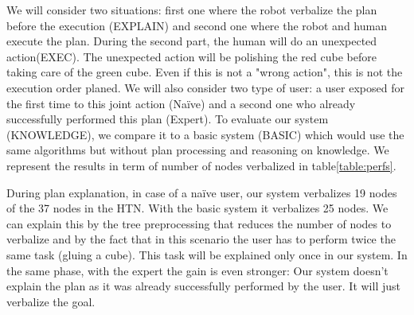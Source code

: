 \documentclass{llncs}
\begin{document}
We will consider two situations: first one where the robot verbalize the plan before the execution (EXPLAIN) and second one where the robot and human execute the plan. During the second part, the human will do an unexpected action(EXEC). The unexpected action will be polishing the red cube before taking care of the green cube. Even if this is not a "wrong action", this is not the execution order planed. We will also consider two type of user: a user exposed for the first time to this joint action (Na\"ive) and a second one who already successfully performed this plan (Expert).
%
%
%
%
To evaluate our system (KNOWLEDGE), we compare it to a basic system (BASIC) which would use the same algorithms but without plan processing and reasoning on knowledge. We represent the results in term of number of nodes verbalized in table\ref{table:perfs}.

During plan explanation, in case of a na\"ive user, our system verbalizes 19 nodes of the 37 nodes in the HTN. With the basic system it verbalizes 25 nodes.
We can explain this by the tree preprocessing that reduces the number of nodes to verbalize and by the fact that in this scenario the user has to perform twice the same task (gluing a cube). This task will be explained only once in our system.
In the same phase, with the expert the gain is even stronger: Our system doesn't explain the plan as it was already successfully performed by the user. It will just verbalize the goal.
\end{document}
